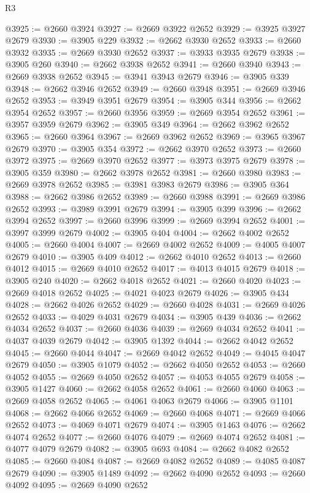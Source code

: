 \begin{lexlean}{R3}
\begin{coremodule}
@3925 := @2660 @3924
@3927 := @2669 @3922 @2652
@3929 := @3925 @3927 @2679
@3930 := @3905 @229
@3932 := @2662 @3930 @2652
@3933 := @2660 @3932
@3935 := @2669 @3930 @2652
@3937 := @3933 @3935 @2679
@3938 := @3905 @260
@3940 := @2662 @3938 @2652
@3941 := @2660 @3940
@3943 := @2669 @3938 @2652
@3945 := @3941 @3943 @2679
@3946 := @3905 @339
@3948 := @2662 @3946 @2652
@3949 := @2660 @3948
@3951 := @2669 @3946 @2652
@3953 := @3949 @3951 @2679
@3954 := @3905 @344
@3956 := @2662 @3954 @2652
@3957 := @2660 @3956
@3959 := @2669 @3954 @2652
@3961 := @3957 @3959 @2679
@3962 := @3905 @349
@3964 := @2662 @3962 @2652
@3965 := @2660 @3964
@3967 := @2669 @3962 @2652
@3969 := @3965 @3967 @2679
@3970 := @3905 @354
@3972 := @2662 @3970 @2652
@3973 := @2660 @3972
@3975 := @2669 @3970 @2652
@3977 := @3973 @3975 @2679
@3978 := @3905 @359
@3980 := @2662 @3978 @2652
@3981 := @2660 @3980
@3983 := @2669 @3978 @2652
@3985 := @3981 @3983 @2679
@3986 := @3905 @364
@3988 := @2662 @3986 @2652
@3989 := @2660 @3988
@3991 := @2669 @3986 @2652
@3993 := @3989 @3991 @2679
@3994 := @3905 @399
@3996 := @2662 @3994 @2652
@3997 := @2660 @3996
@3999 := @2669 @3994 @2652
@4001 := @3997 @3999 @2679
@4002 := @3905 @404
@4004 := @2662 @4002 @2652
@4005 := @2660 @4004
@4007 := @2669 @4002 @2652
@4009 := @4005 @4007 @2679
@4010 := @3905 @409
@4012 := @2662 @4010 @2652
@4013 := @2660 @4012
@4015 := @2669 @4010 @2652
@4017 := @4013 @4015 @2679
@4018 := @3905 @240
@4020 := @2662 @4018 @2652
@4021 := @2660 @4020
@4023 := @2669 @4018 @2652
@4025 := @4021 @4023 @2679
@4026 := @3905 @434
@4028 := @2662 @4026 @2652
@4029 := @2660 @4028
@4031 := @2669 @4026 @2652
@4033 := @4029 @4031 @2679
@4034 := @3905 @439
@4036 := @2662 @4034 @2652
@4037 := @2660 @4036
@4039 := @2669 @4034 @2652
@4041 := @4037 @4039 @2679
@4042 := @3905 @1392
@4044 := @2662 @4042 @2652
@4045 := @2660 @4044
@4047 := @2669 @4042 @2652
@4049 := @4045 @4047 @2679
@4050 := @3905 @1079
@4052 := @2662 @4050 @2652
@4053 := @2660 @4052
@4055 := @2669 @4050 @2652
@4057 := @4053 @4055 @2679
@4058 := @3905 @1427
@4060 := @2662 @4058 @2652
@4061 := @2660 @4060
@4063 := @2669 @4058 @2652
@4065 := @4061 @4063 @2679
@4066 := @3905 @1101
@4068 := @2662 @4066 @2652
@4069 := @2660 @4068
@4071 := @2669 @4066 @2652
@4073 := @4069 @4071 @2679
@4074 := @3905 @1463
@4076 := @2662 @4074 @2652
@4077 := @2660 @4076
@4079 := @2669 @4074 @2652
@4081 := @4077 @4079 @2679
@4082 := @3905 @693
@4084 := @2662 @4082 @2652
@4085 := @2660 @4084
@4087 := @2669 @4082 @2652
@4089 := @4085 @4087 @2679
@4090 := @3905 @1489
@4092 := @2662 @4090 @2652
@4093 := @2660 @4092
@4095 := @2669 @4090 @2652

\end{coremodule}
\end{lexlean}
